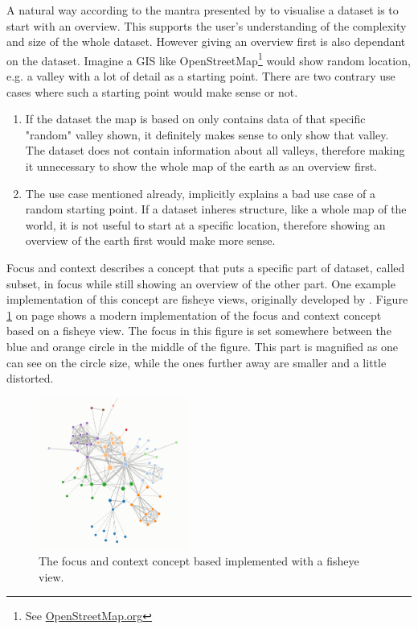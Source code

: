 A natural way according to the mantra presented by \citeauthor{Shneiderman1996} to visualise a dataset is to start with an overview. This supports the user's understanding of the complexity and size of the whole dataset. However giving an overview first is also dependant on the dataset. Imagine a \ac{GIS} like OpenStreetMap\footnote{See \href{https://www.openstreetmap.org}{OpenStreetMap.org}} would show random location, e.g. a valley with a lot of detail as a starting point. There are two contrary use cases where such a starting point would make sense or not.
\begin{enumerate}
\item If the dataset the map is based on only contains data of that specific "random" valley shown, it definitely makes sense to only show that valley. The dataset does not contain information about all valleys, therefore making it unnecessary to show the whole map of the earth as an overview first.
\item The use case mentioned already, implicitly explains a bad use case of a random starting point. If a dataset inheres structure, like a whole map of the world, it is not useful to start at a specific location, therefore showing an overview of the earth first would make more sense.
\end{enumerate}

Focus and context describes a concept that puts a specific part of dataset, called subset, in focus while still showing an overview of the other part. One example implementation of this concept are fisheye views, originally developed by \citeauthor{Furnas:1986} . Figure \ref{fig:focus} on page \pageref{fig:focus} shows a modern implementation of the focus and context concept based on a fisheye view. The focus in this figure is set somewhere between the blue and orange circle in the middle of the figure. This part is magnified as one can see on the circle size, while the ones further away are smaller and a little distorted.

\begin{figure}[!htb]
\centering
\includegraphics[height=5cm,keepaspectratio]{images/methods/interaction/focus.png}
\caption[
    The focus and context concept based implemented with a fisheye view, Urldate: 07.2016 \newline
    \small\texttt{\url{https://bost.ocks.org/mike/fisheye/}}.
]{The focus and context concept based implemented with a fisheye view.}
\label{fig:focus}
\end{figure}

